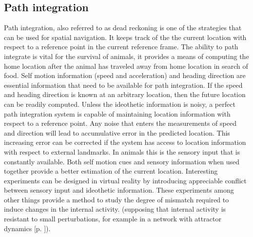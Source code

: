 \subsection{Path integration}
\label{pathIntgr}
Path integration, also referred to as dead reckoning is one of the strategies that can be used for spatial navigation. It keeps track of the the current location with respect to a reference point in the current reference frame. The ability to path integrate is vital for the survival of animals, it provides a means of computing the home location after the animal has traveled away from home location in search of food.
Self motion information (speed and acceleration) and heading direction are essential information that need to be available for path integration. If the speed and heading direction is known at an arbitrary location, then the future location can be readily computed. Unless the ideothetic information is noisy, a perfect path integration system is capable of maintaining location information with respect to a reference point. Any noise that enters the measurements of speed and direction will lead to accumulative error in the predicted location. This increasing error can be corrected if the system has access to location information with respect to external landmarks. In animals this is the sensory input that is constantly available. Both self motion cues and sensory information when used together provide a better estimation of the current location. Interesting experiments can be designed in virtual reality by introducing appreciable conflict between sensory input and ideothetic information. These experiments among other things provide a method to study the degree of mismatch required to induce changes in the internal activity. (supposing that internal activity is resistant to small perturbations, for example in a network with attractor dynamics [p. \pageref{fixedpt}]). 

